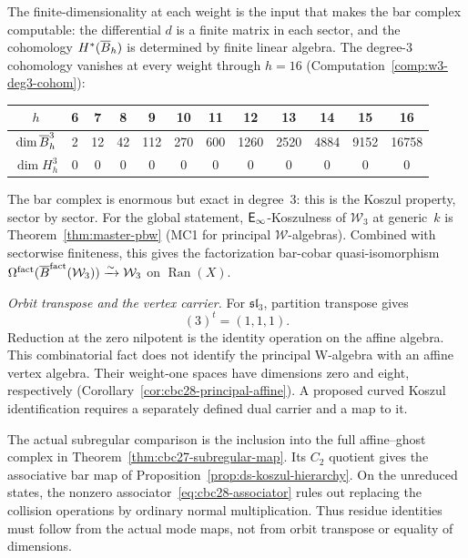 The finite-dimensionality at each weight is the input that makes the
bar complex computable: the differential $d$ is a finite matrix
in each sector, and the cohomology $H^*(\overline{B}_h)$ is determined by
finite linear algebra.  The degree-$3$ cohomology vanishes
at every weight through $h = 16$
(Computation~\ref{comp:w3-deg3-cohom}):
\begin{center}
\renewcommand{\arraystretch}{1.1}
\begin{tabular}{c|ccccccccccc}
$h$ & 6 & 7 & 8 & 9 & 10 & 11 & 12 & 13 & 14 & 15 & 16 \\
\hline
$\dim \overline{B}^3_h$ & 2 & 12 & 42 & 112 & 270 & 600 & 1260 & 2520 & 4884 & 9152 & 16758 \\
$\dim H^3_h$ & 0 & 0 & 0 & 0 & 0 & 0 & 0 & 0 & 0 & 0 & 0
\end{tabular}
\end{center}
The bar complex is enormous but exact in degree~$3$: this is the
Koszul property, sector by sector.  For the global statement,
$\mathsf{E}_{\infty}$-Koszulness of $\mathcal{W}_3$ at generic~$k$ is
Theorem~\ref{thm:master-pbw} (MC1 for principal $\mathcal{W}$-algebras).
Combined with sectorwise finiteness, this gives the factorization
bar-cobar quasi-isomorphism
$\Omega^{\mathrm{fact}}(\overline{B}^{\mathrm{fact}}(\mathcal{W}_3))
\xrightarrow{\sim} \mathcal{W}_3$
on $\operatorname{Ran}(X)$.

\emph{Orbit transpose and the vertex carrier.}
For $\mathfrak{sl}_3$, partition transpose gives
\begin{equation}\label{eq:w3-kd-explicit}
 (3)^t=(1,1,1).
\end{equation}
Reduction at the zero nilpotent is the identity operation on the affine algebra.
This combinatorial fact does not identify the principal W-algebra with an affine vertex algebra.
Their weight-one spaces have dimensions zero and eight, respectively
(Corollary~\ref{cor:cbc28-principal-affine}).
A proposed curved Koszul identification requires a separately defined dual carrier and a map to it.

The actual subregular comparison is the inclusion into the full affine--ghost complex in Theorem~\ref{thm:cbc27-subregular-map}.
Its $C_2$ quotient gives the associative bar map of Proposition~\ref{prop:ds-koszul-hierarchy}.
On the unreduced states, the nonzero associator~\eqref{eq:cbc28-associator} rules out replacing the collision operations by ordinary normal multiplication.
Thus residue identities must follow from the actual mode maps, not from orbit transpose or equality of dimensions.

